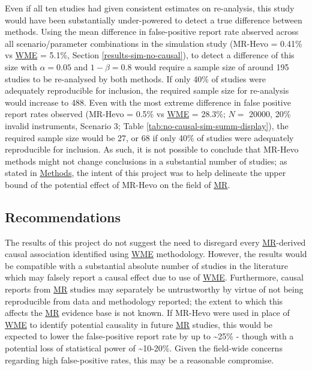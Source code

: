 \documentclass[
]{article}
\begin{document}
Even if all ten studies had given consistent estimates on re-analysis, this study would have been substantially under-powered to detect a true difference between methods. Using the mean difference in false-positive report rate abserved across all scenario/parameter combinations in the simulation study (MR-Hevo = 0.41\% vs \hyperref[acronyms_WME]{WME} = 5.1\%, Section \ref{results-sim-no-causal}), to detect a difference of this size with \(\alpha = 0.05\) and \(1 - \beta = 0.8\) would require a sample size of around 195 studies to be re-analysed by both methods. If only 40\% of studies were adequately reproducible for inclusion, the required sample size for re-analysis would increase to 488. Even with the most extreme difference in false positive report rates observed (MR-Hevo = 0.5\% vs \hyperref[acronyms_WME]{WME} = 28.3\%; \(N =\) 20000, 20\% invalid instruments, Scenario 3; Table \ref{tab:no-causal-sim-summ-display}), the required sample size would be 27, or 68 if only 40\% of studies were adequately reproducible for inclusion. As such, it is not possible to conclude that MR-Hevo methods might not change conclusions in a substantial number of studies; as stated in \hyperref[methods]{Methods}, the intent of this project was to help delineate the upper bound of the potential effect of MR-Hevo on the field of \hyperref[acronyms_MR]{MR}.

\subsection{Recommendations}\label{recommendations}

The results of this project do not suggest the need to disregard every \hyperref[acronyms_MR]{MR}-derived causal association identified using \hyperref[acronyms_WME]{WME} methodology. However, the results would be compatible with a substantial absolute number of studies in the literature which may falsely report a causal effect due to use of \hyperref[acronyms_WME]{WME}. Furthermore, causal reports from \hyperref[acronyms_MR]{MR} studies may separately be untrustworthy by virtue of not being reproducible from data and methodology reported; the extent to which this affects the \hyperref[acronyms_MR]{MR} evidence base is not known. If MR-Hevo were used in place of \hyperref[acronyms_WME]{WME} to identify potential causality in future \hyperref[acronyms_MR]{MR} studies, this would be expected to lower the false-positive report rate by up to \textasciitilde25\% - though with a potential loss of statistical power of \textasciitilde10-20\%. Given the field-wide concerns regarding high false-positive rates, this may be a reasonable compromise.
\end{document}
